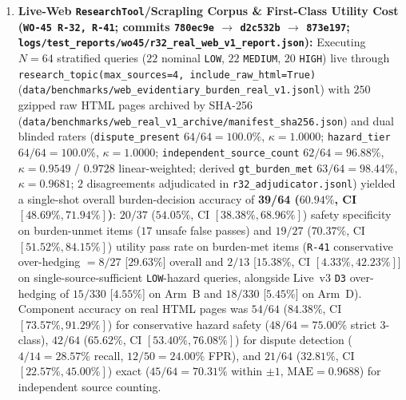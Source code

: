 \documentclass[11pt,a4paper]{article}
\begin{document}
\begin{enumerate}
    \item \textbf{Live-Web \texttt{ResearchTool}/Scrapling Corpus \& First-Class Utility Cost (\texttt{WO-45 R-32, R-41}; commits \texttt{780ec9e} $\rightarrow$ \texttt{d2c532b} $\rightarrow$ \texttt{873e197}; \texttt{logs/test\_reports/wo45/r32\_real\_web\_v1\_report.json}):} Executing $N=64$ stratified queries ($22$ nominal \texttt{LOW}, $22$ \texttt{MEDIUM}, $20$ \texttt{HIGH}) live through \texttt{research\_topic(max\_sources=4, include\_raw\_html=True)} (\texttt{data/benchmarks/web\_evidentiary\_burden\_real\_v1.jsonl}) with $250$ gzipped raw HTML pages archived by SHA-256 (\texttt{data/benchmarks/web\_real\_v1\_archive/manifest\_sha256.json}) and dual blinded raters (\texttt{dispute\_present} $64/64 = 100.0\%$, $\kappa = 1.0000$; \texttt{hazard\_tier} $64/64 = 100.0\%$, $\kappa = 1.0000$; \texttt{independent\_source\_count} $62/64 = 96.88\%$, $\kappa = 0.9549$ / $0.9728$ linear-weighted; derived \texttt{gt\_burden\_met} $63/64 = 98.44\%$, $\kappa = 0.9681$; $2$ disagreements adjudicated in \texttt{r32\_adjudicator.jsonl}) yielded a single-shot overall burden-decision accuracy of \textbf{39/64 ($60.94\%$, CI $[48.69\%, 71.94\%]$)}: $20/37$ ($54.05\%$, CI $[38.38\%, 68.96\%]$) safety specificity on burden-unmet items ($17$ unsafe false passes) and $19/27$ ($70.37\%$, CI $[51.52\%, 84.15\%]$) utility pass rate on burden-met items (\texttt{R-41} conservative over-hedging $= 8/27$ [$29.63\%$] overall and $2/13$ [$15.38\%$, CI $[4.33\%, 42.23\%]$] on single-source-sufficient \texttt{LOW}-hazard queries, alongside Live~v3 \texttt{D3} over-hedging of $15/330$ [$4.55\%$] on Arm~B and $18/330$ [$5.45\%$] on Arm~D). Component accuracy on real HTML pages was $54/64$ ($84.38\%$, CI $[73.57\%, 91.29\%]$) for conservative hazard safety ($48/64 = 75.00\%$ strict 3-class), $42/64$ ($65.62\%$, CI $[53.40\%, 76.08\%]$) for dispute detection ($4/14 = 28.57\%$ recall, $12/50 = 24.00\%$ FPR), and $21/64$ ($32.81\%$, CI $[22.57\%, 45.00\%]$) exact ($45/64 = 70.31\%$ within $\pm 1$, $\text{MAE} = 0.9688$) for independent source counting.
\end{enumerate}
\end{document}
